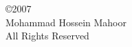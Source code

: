 \newpage
\thispagestyle{empty}
\vspace*{7.5in}
\begin{center}
\copyright 2007\\
\vspace{0.1in}
Mohammad Hossein Mahoor\\
\vspace{0.1in}
All Rights Reserved\\
\end{center}
